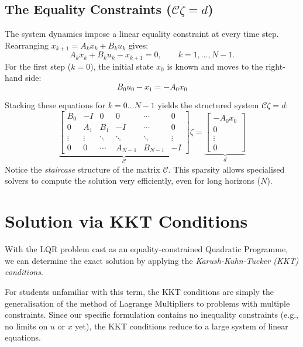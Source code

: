 \subsection*{The Equality Constraints ($\mathcal{C}\zeta = d$)}
The system dynamics impose a linear equality constraint at every time step. Rearranging $x_{k+1} = A_k x_k + B_k u_k$ gives:
\begin{equation*}
	A_k x_k + B_k u_k - x_{k+1} = 0, \qquad k = 1, \dots, N{-}1.
\end{equation*}
For the first step ($k=0$), the initial state $x_0$ is known and moves to the right-hand side:
\begin{equation*}
	B_0 u_0 - x_1 = -A_0 x_0
\end{equation*}

Stacking these equations for $k=0 \dots N-1$ yields the structured system $\mathcal{C}\zeta = d$:
\begin{equation*}
	\underbrace{
		\begin{bmatrix}
			B_0 & -I & 0 & 0 & \cdots & 0 \\
			0 & A_1 & B_1 & -I & \cdots & 0 \\
			\vdots & \vdots& \ddots & \ddots & \ddots & \vdots \\
			0 & 0 & \cdots & A_{N-1} & B_{N-1} & -I
		\end{bmatrix}
	}_{\mathcal{C}}
	\zeta
	=
	\underbrace{
		\begin{bmatrix} -A_0 x_0 \\ 0 \\ \vdots \\ 0 \end{bmatrix}
	}_{d}
\end{equation*}
Notice the \emph{staircase} structure of the matrix $\mathcal{C}$. This sparsity allows specialised solvers to compute the solution very efficiently, even for long horizons ($N$).

\section{Solution via KKT Conditions}

With the LQR problem cast as an equality-constrained Quadratic Programme, we can determine the exact solution by applying the \emph{Karush-Kuhn-Tucker (KKT) conditions}. 

For students unfamiliar with this term, the KKT conditions are simply the generalisation of the method of Lagrange Multipliers to problems with multiple constraints. Since our specific formulation contains no inequality constraints (e.g., no limits on $u$ or $x$ yet), the KKT conditions reduce to a large system of linear equations.


